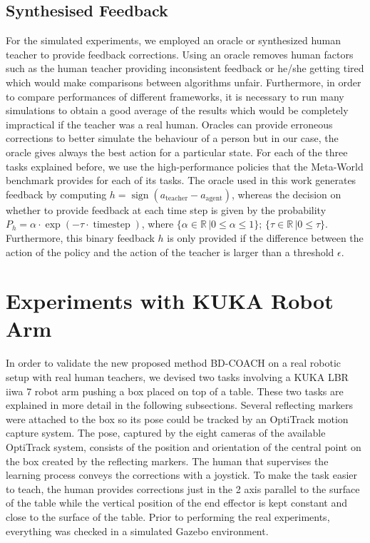 \subsection{Synthesised Feedback}
\label{subsection:Synthesised Feedback}



For the simulated experiments, we employed an oracle or synthesized human teacher to provide feedback corrections. Using an oracle removes human factors such as the human teacher providing inconsistent feedback or he/she getting tired which would make comparisons between algorithms unfair. Furthermore, in order to compare performances of different frameworks, it is necessary to run many simulations to obtain a good average of the results which would be completely impractical if the teacher was a real human. Oracles can provide erroneous corrections to better simulate the behaviour of a person but in our case, the oracle gives always the best action for a particular state. 
For each of the three tasks explained before, we use the high-performance policies that the Meta-World benchmark provides for each of its tasks. The oracle used in this work generates feedback by computing $h = \operatorname{sign}(a_\text{teacher} - a_\text{agent})$, whereas the decision on whether to provide feedback at each time step is given by the probability $P_h = \alpha \cdot \operatorname{exp}(-\tau \cdot \operatorname{time step})$, where $\{\alpha \in \mathbb{R}\, | 0 \leq \alpha \leq 1 \}$; $\{\tau \in \mathbb{R} \, | 0 \leq \tau\}$. Furthermore, this binary feedback $h$ is only provided if the difference between the action of the policy and the action of the teacher is larger than a threshold $\epsilon$.





\section{Experiments with KUKA Robot Arm}
\label{section:Experiments with KUKA robot arm}

In order to validate the new proposed method BD-COACH on a real robotic setup with real human teachers, we devised two tasks involving a KUKA LBR iiwa 7 robot arm pushing a box placed on top of a table. These two tasks are explained in more detail in the following subsections. Several reflecting markers were attached to the box so its pose could be tracked by an OptiTrack motion capture system. The pose, captured by the eight cameras of the available OptiTrack system, consists of the position and orientation of the central point on the box created by the reflecting markers. The human that supervises the learning process conveys the corrections with a joystick. To make the task easier to teach, the human provides corrections just in the 2 axis parallel to the surface of the table while the vertical position of the end effector is kept constant and close to the surface of the table. Prior to performing the real experiments, everything was checked in a simulated Gazebo environment.

